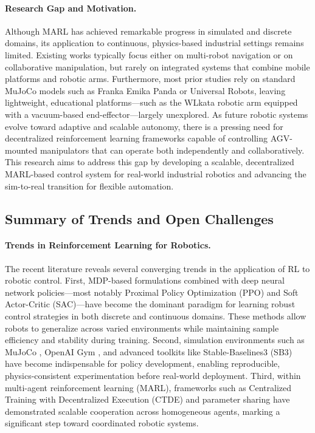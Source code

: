 \documentclass[english, 12pt, a4paper, elec, utf8, a-2b, online]{aaltothesis}
\begin{document}
\paragraph{Research Gap and Motivation.}
Although MARL has achieved remarkable progress in simulated and discrete domains, its application to continuous, physics-based industrial settings remains limited. Existing works typically focus either on multi-robot navigation or on collaborative manipulation, but rarely on integrated systems that combine mobile platforms and robotic arms. Furthermore, most prior studies rely on standard MuJoCo models such as Franka Emika Panda or Universal Robots, leaving lightweight, educational platforms—such as the WLkata robotic arm equipped with a vacuum-based end-effector—largely unexplored. As future robotic systems evolve toward adaptive and scalable autonomy, there is a pressing need for decentralized reinforcement learning frameworks capable of controlling AGV-mounted manipulators that can operate both independently and collaboratively. This research aims to address this gap by developing a scalable, decentralized MARL-based control system for real-world industrial robotics and advancing the sim-to-real transition for flexible automation.


\subsection{Summary of Trends and Open Challenges}

\paragraph{Trends in Reinforcement Learning for Robotics.}
The recent literature reveals several converging trends in the application of RL to robotic control. First, MDP-based formulations combined with deep neural network policies—most notably Proximal Policy Optimization (PPO) and Soft Actor-Critic (SAC)—have become the dominant paradigm for learning robust control strategies in both discrete and continuous domains. These methods allow robots to generalize across varied environments while maintaining sample efficiency and stability during training. Second, simulation environments such as MuJoCo \cite{todorov2012mujoco}, OpenAI Gym \cite{brockman2016openai}, and advanced toolkits like Stable-Baselines3 (SB3) \cite{raffin2021stable} have become indispensable for policy development, enabling reproducible, physics-consistent experimentation before real-world deployment. Third, within multi-agent reinforcement learning (MARL), frameworks such as Centralized Training with Decentralized Execution (CTDE) \cite{lowe2017multi} and parameter sharing \cite{gupta2017cooperative} have demonstrated scalable cooperation across homogeneous agents, marking a significant step toward coordinated robotic systems.
\end{document}
